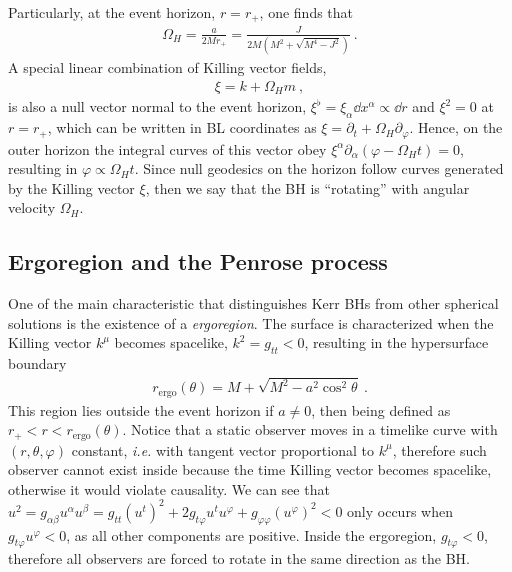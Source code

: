 Particularly, at the event horizon, $r=r_+$, one finds that
\begin{align}
    \Omega_H = \frac{a}{2 M r_+} = \frac{J}{2 M \left(M^2+\sqrt{M^4-J^2}\right)} ~.
    \label{eq2:angMomentumH}
\end{align}
A special linear combination of Killing vector fields,
\begin{align}
    \xi = k + \Omega_H m ~,
    \label{eq2:KillingXi}
\end{align}
is also a null vector normal to the event horizon, $\xi^\flat=\xi_\alpha \dd x^\alpha \propto \dd r$ and $\xi^2 = 0$ at $r=r_+$, which can be written in BL coordinates as $\xi = \partial_t + \Omega_H \partial_\varphi$.
Hence, on the outer horizon the integral curves of this vector obey $\xi^\alpha \partial_\alpha (\varphi - \Omega_H t) = 0$, resulting in $\varphi \propto \Omega_H t$.
Since null geodesics on the horizon follow curves generated by the Killing vector $\xi$, then we say that the BH is ``rotating'' with angular velocity $\Omega_H$.

\subsection{Ergoregion and the Penrose process}

One of the main characteristic that distinguishes Kerr BHs from other spherical solutions is the existence of a \emph{ergoregion}.
The surface is characterized when the Killing vector $k^\mu$ becomes spacelike, $k^2=g_{tt}<0$, resulting in the hypersurface boundary
\begin{align}
    r_{\mathrm{ergo}}(\theta) = M + \sqrt{M^2 - a^2 \cos^2\theta} ~.
    \label{eq2:KerrErgo}
\end{align}
This region lies outside the event horizon if $a\ne0$, then being defined as $r_+< r < r_{\mathrm{ergo}}(\theta)$.
Notice that a static observer moves in a timelike curve with $(r,\theta,\varphi)$ constant, \emph{i.e.} with tangent vector proportional to $k^\mu$, therefore such observer cannot exist inside because the time Killing vector becomes spacelike, otherwise it would violate causality. We can see that $u^2=g_{\alpha\beta}u^\alpha u^\beta = g_{tt} (u^t)^2 + 2 g_{t\varphi} u^t u^\varphi +  g_{\varphi\varphi} (u^\varphi)^2 < 0$ only occurs when $g_{t\varphi} u^\varphi < 0$, as all other components are positive. Inside the ergoregion, $g_{t\varphi}<0$, therefore all observers are forced to rotate in the same direction as the BH.

